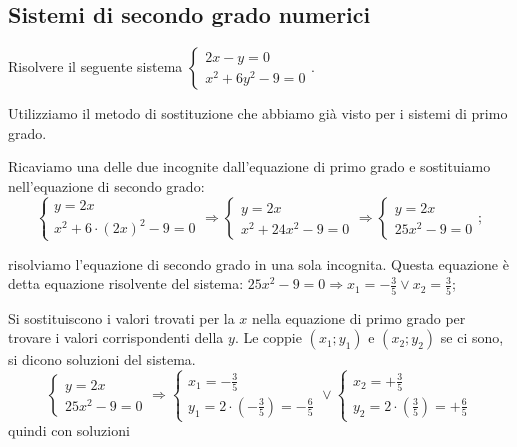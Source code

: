 \subsection{Sistemi di secondo grado numerici}
\begin{exrig}
\begin{esempio}
Risolvere il seguente sistema $\left\{\begin{array}{l}{2x-y=0}\\{x^2+6y^2-9=0}\end{array}\right..$

Utilizziamo il metodo di sostituzione che abbiamo già visto per i sistemi di primo grado.
\begin{itemize*}
\item Ricaviamo una delle due incognite dall’equazione di primo grado e sostituiamo nell’equazione di secondo grado:
\[\left\{\begin{array}{l}y=2x \\
x^2+6\cdot (2x)^2-9=0\end{array}\right. 
\Rightarrow\left\{\begin{array}{l}y=2x \\
x^2+24x^2-9=0\end{array}\right. 
\Rightarrow \left\{\begin{array}{l}y=2x \\
25x^2-9=0\end{array}\right.;\]
\item risolviamo l'equazione di secondo grado in una sola incognita. Questa equazione è detta equazione risolvente del sistema:
 $25x^2-9=0\Rightarrow x_1=-\frac 3 5\vee x_2=\frac 3 5$;
\item Si sostituiscono i valori trovati per la $ x $ nella equazione di primo grado per trovare i valori corrispondenti della $ y $. Le coppie $(x_1;y_1)$ e $(x_2;y_2)$ se ci sono, si dicono soluzioni del sistema.
\[\left\{\begin{array}{l}{y=2x}\\
{25x^2-9=0}\end{array}\right. 
\Rightarrow \left\{\begin{array}{l}x_1=-\frac 3 5 \\
y_1=2\cdot \left(-\frac 3 5\right)=-\frac 6 5\end{array}\right.\vee 
\left\{\begin{array}{l}x_2=+\frac 3 5 \\
y_2=2\cdot \left(\frac 3 5\right)=+\frac 6 5 \end{array}\right.\] 
quindi con soluzioni 

\end{itemize*}
\end{esempio}
\end{exrig}
